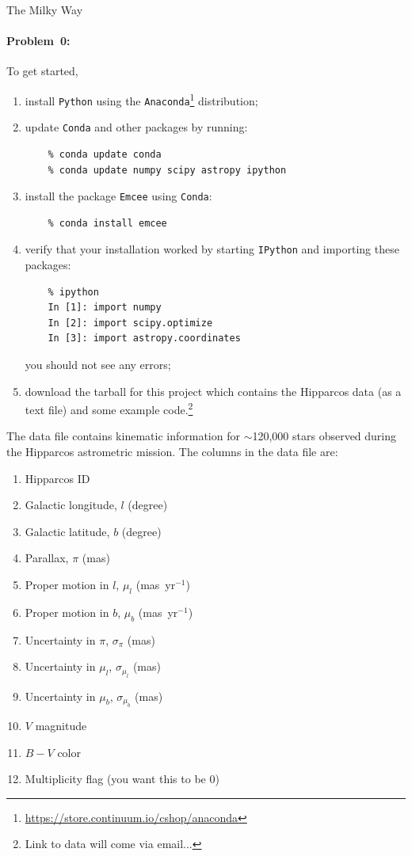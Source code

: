 \documentclass[12pt,twoside]{article}
\newcommand{\projectname}[1]{\begin{center} {\huge {#1}} \end{center}}
\newcommand{\problemname}{Problem}
\newcounter{problem}
\newenvironment{problem0}{\paragraph{\problemname~0:}}{}
\begin{document}
\projectname{The Milky Way}

\begin{problem0}
To get started, 
	\begin{enumerate}
		\item install \texttt{Python} using the \texttt{Anaconda}\footnote{\url{https://store.continuum.io/cshop/anaconda}} distribution;
		\item update \texttt{Conda} and other packages by running:
			\begin{verbatim}
    % conda update conda
    % conda update numpy scipy astropy ipython
			\end{verbatim}
		\item install the package \texttt{Emcee} using \texttt{Conda}:
			\begin{verbatim}
    % conda install emcee
			\end{verbatim}
		\item verify that your installation worked by starting \texttt{IPython} and importing these packages:
			\begin{verbatim}
    % ipython
    In [1]: import numpy
    In [2]: import scipy.optimize
    In [3]: import astropy.coordinates
			\end{verbatim}
			you should not see any errors;
		\item download the tarball for this project which contains the Hipparcos data (as a text file) and some example code.\footnote{Link to data will come via email...}
		
	\end{enumerate}
	
The data file contains kinematic information for $\sim$120,000 stars observed during the Hipparcos astrometric mission. The columns in the data file are:
\begin{multicols}{2}
	\begin{enumerate}[align=left,leftmargin=!,label={\bf Col. \arabic*:}]
		\item Hipparcos ID
		\item Galactic longitude, $l$ (degree)
		\item Galactic latitude, $b$ (degree)
		\item Parallax, $\pi$ (mas)
		\item Proper motion in $l$, $\mu_l$ (mas~yr$^{-1}$)
		\item Proper motion in $b$, $\mu_b$ (mas~yr$^{-1}$)
		\item Uncertainty in $\pi$, $\sigma_\pi$ (mas)
		\item Uncertainty in $\mu_l$, $\sigma_{\mu_l}$ (mas)
		\item Uncertainty in $\mu_b$, $\sigma_{\mu_b}$ (mas)
		\item $V$ magnitude
		\item $B-V$ color
		\item Multiplicity flag (you want this to be 0)
	\end{enumerate}
\end{multicols}
\end{problem0}
\end{document}
